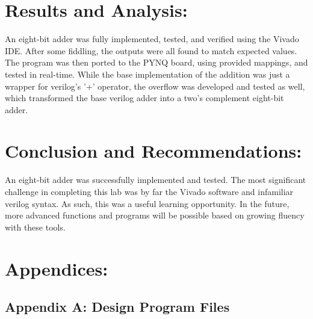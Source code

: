 \documentclass[12pt,a4paper]{article}
\begin{document}
\section*{Results and Analysis:}

An eight-bit adder was fully implemented, tested, and verified using the Vivado IDE.
After some fiddling, the outputs were all found to match expected values.
The program was then ported to the PYNQ board, using provided mappings, and tested
in real-time. While the base implementation of the addition was just a wrapper for
verilog's '+' operator, the overflow was developed and tested as well, which transformed
the base verilog adder into a two's complement eight-bit adder. \\


\section*{Conclusion and Recommendations:}

An eight-bit adder was successfully implemented and tested. 
The most significant challenge in completing this lab was by far the Vivado software 
and infamiliar verilog syntax. As such, this was a useful learning opportunity.
In the future, more advanced functions and programs will be possible based on
growing fluency with these tools. 

\newpage
\section*{Appendices:}

\subsection{Appendix A: Design Program Files}
\end{document}
